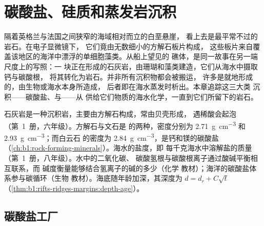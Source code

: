 \chapter{碳酸盐、硅质和蒸发岩沉积}\label{ch:b1:chemical-biogenic-sediments}

隔着英格兰与法国之间狭窄的海域相对而立的白垩悬崖，
看上去是最平常不过的岩石。在电子显微镜下，
它们竟由无数细小的方解石板片构成，
这些板片来自覆盖该地区的海洋中漂浮的单细胞藻类。从船上望见的
礁体，是同一故事在另一端尺度上的写照：一
块正在形成的石灰岩，由珊瑚和藻类建造，它们从海水中摄取钙与碳酸根，
将其转化为岩石。并非所有沉积物都会被搬运，
许多是就地形成的，由生物或海水本身所造成，
后者即在海水蒸发时析出。本章追踪这三大类
沉积——碳酸盐、与——从
供给它们物质的海水化学，一直到它们所留下的岩石。

\begin{recall}
石灰岩是一种沉积岩，主要由方解石构成，常由贝壳形成，
遇稀酸会起泡（第~1~册，六年级）。方解石与文石是
 的两种，密度分别为 \qty{2.71}{g.cm^{-3}} 和
\qty{2.93}{g.cm^{-3}}；而白云石  的密度为
\qty{2.84}{g.cm^{-3}}，是钙和镁的碳酸盐
（\cref{ch:b1:rock-forming-minerals}）。海水的盐度，即
每千克海水中溶解盐的质量（第~1~册，八年级）。水中的二氧化碳、
碳酸氢根与碳酸根离子通过酸碱平衡相互联系，而
碱度衡量能够结合氢离子的碱的多少（化学
教材）；海洋的碳酸盐体系参与碳循环（生物
教材）。海底随年龄加深，其深度为 $d = d_r + C\sqrt t$
（\cref{thm:b1:rifts-ridges-margins:depth-age}）。
\end{recall}

\section{碳酸盐工厂}\label{sec:b1:chemical-biogenic-sediments:factory}

